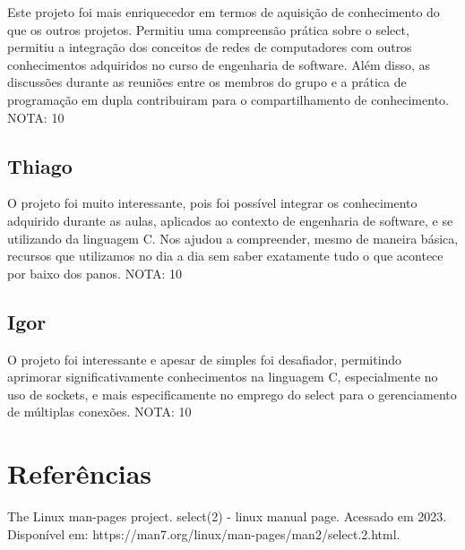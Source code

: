 \documentclass[a4paper]{article}
\begin{document}
Este projeto foi mais enriquecedor em termos de aquisição de conhecimento do que os outros projetos. Permitiu uma compreensão prática sobre o select, permitiu a integração dos conceitos de redes de computadores com outros conhecimentos adquiridos no curso de engenharia de software. Além disso, as discussões durante as reuniões entre os membros do grupo e a prática de programação em dupla contribuiram para o compartilhamento de conhecimento.
NOTA: 10

\subsection{Thiago}

O projeto foi muito interessante, pois foi possível integrar os conhecimento adquirido durante as aulas, aplicados ao contexto de engenharia de software, e se utilizando da linguagem C. Nos ajudou a compreender, mesmo de maneira básica, recursos que utilizamos no dia a dia sem saber exatamente tudo o que acontece por baixo dos panos. 
NOTA: 10

\subsection{Igor}

O projeto foi interessante e apesar de simples foi desafiador, permitindo aprimorar significativamente conhecimentos na linguagem C, especialmente no uso de sockets, e mais especificamente no emprego do select para o gerenciamento de múltiplas conexões.
NOTA: 10

\section{Referências}

The Linux man-pages project. select(2) - linux manual page. Acessado em 2023.
Disponível em: https://man7.org/linux/man-pages/man2/select.2.html. 
\end{document}
